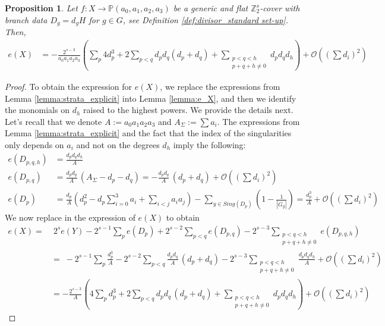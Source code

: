 \documentclass[12pt,twoside,]{amsart}
\theoremstyle{plain}
\newtheorem{proposition}[theorem]{Proposition}
\theoremstyle{definition}
\begin{document}
\begin{proposition}
\label{prop:e_k3}
Let $f: X \rightarrow \mathbb{P}(a_0,a_1,a_2,a_3)$ be a generic and flat $\mathbb{Z}_2^s$-cover with branch data
$D_{g} =d_gH$ for $g \in G$, see Definition \ref{def:divisor_standard set-up}. 
Then, 
\begin{align*}
e(X) &=
-\frac{2^{s-3}}{a_0a_1a_2a_3}
\left( 
\sum_{p}4d_p^3 
+
2\sum_{p<q}d_p d_q(d_p+d_q)
+
\sum_{\substack{p < q <h  \\ p+q+h \neq 0 } }
d_pd_qd_h
\right)
+ \mathcal{O}\left( 
\left(
\sum d_i \right)^2
\right)
 \end{align*}  
\end{proposition}

\begin{proof}
To obtain the expression for $e(X)$, we replace the expressions from Lemma \ref{lemma:strata_explicit} into Lemma \ref{lemma:e_X}, and then we identify the monomials on $d_h$ raised to the highest powers.  We provide the details next. 
Let's recall that we denote
$A:=a_0a_1a_2a_3$ and $A_{\Sigma}:=\sum a_i$. The expressions from Lemma \ref{lemma:strata_explicit} and the fact that the index of the singularities only depends on $a_i$ and not on the degrees $d_h$ imply the following:
\begin{align*}
  e(D_{p,q,h}) &= \displaystyle\frac{d_pd_qd_h}{A} 
  &&
  \\
  e(D_{p,q})  &=  \frac{d_p d_q}{A}\,(A_\Sigma-d_p-d_q) 
  =
 - \frac{d_p d_q}{A}\,(d_p +d_q)  
 + \mathcal{O}\left( 
\left(
\sum d_i \right)^2
\right)
  \\
  e(D_{p})  &=  
\frac{d_p}{A} \left(
d_p^2
- d_p\sum_{i=0}^{3} a_i
+ \sum_{i<j} a_ia_j 
\right)
-
\sum_{y \in Sing(D_p)} \left( 1 - \frac{1}{|G_y|} \right)
=
\frac{d_p^3}{A} 
+ \mathcal{O}\left( 
\left(
\sum d_i \right)^2
\right)
 \end{align*} 
We now replace in the expression of $e(X)$ to obtain
\begin{align*}
 e(X) = & \; 2^se(Y)
-2^{s-1}
\sum_{p}e(D_p) 
+
2^{s-2}\sum_{p<q}e(D_{p,q})
- 
2^{s-3} \sum_{\substack{p < q < h \\ 
p+q+h \neq 0
} }
e(D_{p,q,h})
\\
&= \; 
-2^{s-1} \sum_{p} \frac{d_p^3}{A}  
- 2^{s-2}\sum_{p < q} \frac{d_p d_q}{A}\,(d_p+d_q) 
-
 2^{s-3}
\sum_{\substack{p < q < h  \\ 
p+q+h \neq 0
} }
 \displaystyle\frac{d_pd_qd_h}{A} 
+ \mathcal{O}\left( 
\left(
\sum d_i \right)^2
\right)
 \\
 & = 
- \frac{2^{s-3}}{A} \left(
4 \sum_{p} d_p^3  
+ 2\sum_{p < q}  d_p d_q\,(d_p+d_q) 
+
\sum_{\substack{p < q < h \\ 
p+q+h \neq 0
} }
 \displaystyle d_pd_qd_h 
 \right)
+ \mathcal{O}\left( 
\left(
\sum d_i \right)^2
\right)
\end{align*}
\end{proof}
\end{document}

